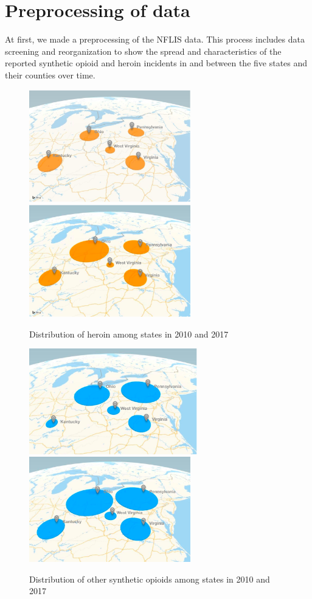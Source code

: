 \documentclass[12pt]{article}
\begin{document}
\section{Preprocessing of data}
At first, we made a preprocessing of the NFLIS data. This process includes data screening and reorganization to show the spread and characteristics of the reported synthetic opioid and heroin incidents in and between the five states and their counties over time.
\begin{figure}[!htbp]
\small
\centering
\includegraphics[width=7cm]{Fig/2010_heroin.png}
\includegraphics[width=7cm]{Fig/2017_heroin.png}
\caption{Distribution of heroin among states in 2010 and 2017}
\end{figure}

\begin{figure}[!htbp]
\small
\centering
\includegraphics[width=7.3cm]{Fig/2010_others.png}
\includegraphics[width=7cm]{Fig/2017_others.png}
\caption{Distribution of other synthetic opioids among states in 2010 and 2017}
\end{figure}
\end{document}
